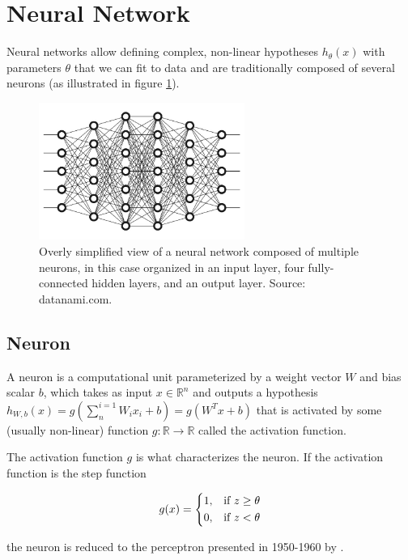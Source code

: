 \section{Neural Network}

Neural networks allow defining complex, non-linear hypotheses $h_\theta(x)$ with parameters $\theta$ that we can fit to data and are traditionally composed of several neurons (as illustrated in figure \ref{fig:neuralnetwork}).

\begin{figure}[ht]
    \centering
    \includegraphics[width=0.6\textwidth]{figs/neuralnetwork.jpeg}
    \caption{Overly simplified view of a neural network composed of multiple neurons, in this case organized in an input layer, four fully-connected hidden layers, and an output layer. Source: datanami.com.}
    \label{fig:neuralnetwork}
\end{figure}

\subsection{Neuron}

A neuron is a computational unit parameterized by a weight vector $W$ and bias scalar $b$, which takes as input $x \in \mathbb{R}^{n}$ and outputs a hypothesis $h_{W,b}(x) = g(\sum^{i=1}_{n} W_{i}x_{i} + b) = g(W^Tx + b)$ that is activated by some (usually non-linear) function $g \colon \mathbb{R} \to \mathbb{R}$ called the activation function.

The activation function $g$ is what characterizes the neuron. If the activation function is the step function

$$
g(x) =
\begin{dcases}
    1,& \text{if } z \geq \theta\\
    0,& \text{if } z < \theta
\end{dcases}
$$

the neuron is reduced to the perceptron presented in 1950-1960 by \citeauthor{perceptron} \cite{perceptron}.

